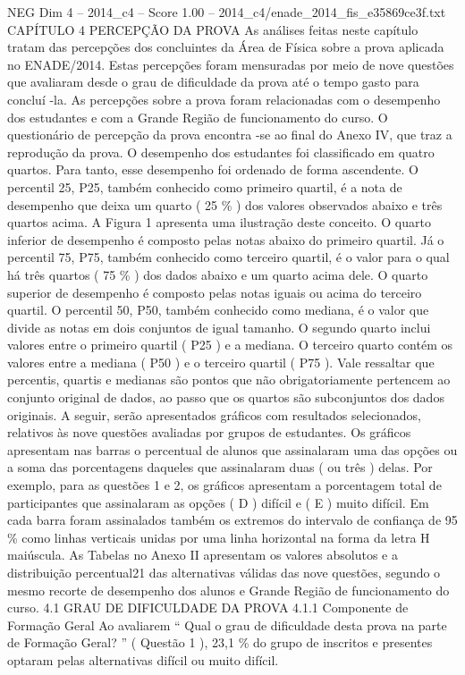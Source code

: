 \begin{textsample}{NEG Dim 4 – 2014\_c4 – Score 1.00 – 2014\_c4/enade\_2014\_fis\_e35869ce3f.txt}  \label{ex:f4_neg_152}
CAPÍTULO 4 PERCEPÇÃO DA PROVA As análises feitas neste capítulo tratam das percepções dos concluintes da Área de Física sobre a prova aplicada no ENADE/2014.
Estas percepções foram mensuradas por meio de nove questões que avaliaram desde o grau de dificuldade da prova até o tempo gasto para concluí -la.
As percepções sobre a prova foram relacionadas com o desempenho dos estudantes e com a Grande Região de funcionamento do curso.
O questionário de percepção da prova encontra -se ao final do Anexo IV, que traz a reprodução da prova.
O desempenho dos estudantes foi classificado em quatro quartos.
Para tanto, esse desempenho foi ordenado de forma ascendente.
O percentil 25, P25, também conhecido como primeiro quartil, é a nota de desempenho que deixa um quarto ( 25 \% ) dos valores observados abaixo e três quartos acima.
A Figura 1 apresenta uma ilustração deste conceito.
O quarto inferior de desempenho é composto pelas notas abaixo do primeiro quartil.
Já o percentil 75, P75, também conhecido como terceiro quartil, é o valor para o qual há três quartos ( 75 \% ) dos dados abaixo e um quarto acima dele.
O quarto superior de desempenho é composto pelas notas iguais ou acima do terceiro quartil.
O percentil 50, P50, também conhecido como mediana, é o valor que divide as notas em dois conjuntos de igual tamanho.
O segundo quarto inclui valores entre o primeiro quartil ( P25 ) e a mediana.
O terceiro quarto contém os valores entre a mediana ( P50 ) e o terceiro quartil ( P75 ).
Vale ressaltar que percentis, quartis e medianas são pontos que não obrigatoriamente pertencem ao conjunto original de dados, ao passo que os quartos são subconjuntos dos dados originais.
A seguir, serão apresentados gráficos com resultados selecionados, relativos às nove questões avaliadas por grupos de estudantes.
Os gráficos apresentam nas barras o percentual de alunos que assinalaram uma das opções ou a soma das porcentagens daqueles que assinalaram duas ( ou três ) delas.
Por exemplo, para as questões 1 e 2, os gráficos apresentam a porcentagem total de participantes que assinalaram as opções ( D ) difícil e ( E ) muito difícil.
Em cada barra foram assinalados também os extremos do intervalo de confiança de 95 \% como linhas verticais unidas por uma linha horizontal na forma da letra H maiúscula.
As Tabelas no Anexo II apresentam os valores absolutos e a distribuição percentual21 das alternativas válidas das nove questões, segundo o mesmo recorte de desempenho dos alunos e Grande Região de funcionamento do curso. 4.1 GRAU DE DIFICULDADE DA PROVA 4.1.1 Componente de Formação Geral Ao avaliarem “ Qual o grau de dificuldade desta prova na parte de Formação Geral? ” ( Questão 1 ), 23,1 \% do grupo de inscritos e presentes optaram pelas alternativas difícil ou muito difícil.

\end{textsample}
